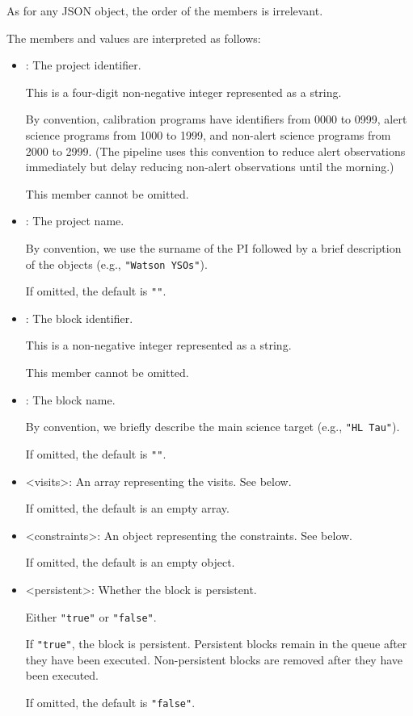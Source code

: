 As for any JSON object, the order of the members is irrelevant.

The members and values are interpreted as follows:

\begin{itemize}
    \item <project-identifier>: The project identifier. 
    
    This is a four-digit non-negative integer represented as a string. 
    
    By convention, calibration programs have identifiers from 0000 to 0999, alert science programs from 1000 to 1999, and non-alert science programs from 2000 to 2999. (The pipeline uses this convention to reduce alert observations immediately but delay reducing non-alert observations until the morning.) 
    
    This member cannot be omitted.
    
    \item <project-name>: The project name. 
    
    By convention, we use the surname of the PI followed by a brief description of the objects (e.g., \verb|"Watson YSOs"|). 
    
    If omitted, the default is \verb|""|.

    \item <block-identifier>: The block identifier. 
    
    This is a non-negative integer represented as a string. 
    
    This member cannot be omitted.

    \item <block-name>: The block name.
    
    By convention, we briefly describe the main science target (e.g., \verb|"HL Tau"|). 
    
    If omitted, the default is \verb|""|.

    \item <visits>: An array representing the visits. See below. 
    
    If omitted, the default is an empty array.
    
    \item <constraints>: An object representing the constraints. See below. 
    
    If omitted, the default is an empty object.

    \item <persistent>: Whether the block is persistent.
    
    Either \verb|"true"| or \verb|"false"|. 
    
    If \verb|"true"|, the block is persistent. Persistent blocks remain in the queue after they have been executed. Non-persistent blocks are removed after they have been executed.
    
    If omitted, the default is \verb|"false"|.

\end{itemize}

